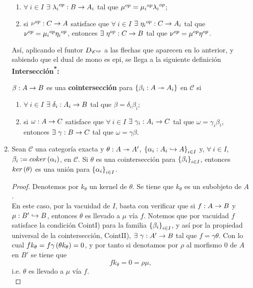 \documentclass{article}
\begin{document}
\begin{enumerate}[label=\textbf{Ej \arabic*.}]
\begin{enumerate}[label=Int\textsuperscript{op}\Roman*)]
			\item $\forall\ i\in I$ $\exists\ \catarrow{\opst{\lambda_i}}{B}{A_i}{}$ tal que ${\mu}^{op}={\mu_i}^{op}{\lambda_i}^{op}$;
			\item si $\catarrow{\opst{\nu}}{C}{A}{}$ satisface que $\forall\ i\in I$ $\exists\ \catarrow{\opst{\eta_i}}{C}{A_i}{}$ tal que ${\nu}^{op}={\mu_i}^{op}{\eta_i}^{op}$, entonces $\exists\ \catarrow{\opst{\eta}}{C}{B}{}$ tal que ${\nu}^{op}={\mu}^{op}{\eta}^{op}$.
		\end{enumerate}
		Así, aplicando el funtor $D_{{\mathscr{C}}^{op}}$ a las flechas que aparecen en lo anterior, y sabiendo que el dual de mono es epi, se llega a la siguiente definición
		\textbf{Intersección\textsuperscript{*}:}
		\begin{definesn}
			$\catarrow{\beta}{A}{B}{}$ es una \textbf{cointersección} para $\lrbrack{\catarrow{\beta_i}{A}{A_i}{e}}$ en $\mathscr{C}$ si
		\begin{enumerate}[label=Coint\Roman*)]
			\item $\forall\ i\in I$ $\exists\ \catarrow{\delta_i}{A_i}{B}{}$ tal que $\beta=\delta_i\beta_i$;
			\item si $\catarrow{\omega}{A}{C}{}$ satisface que $\forall\ i\in I$ $\exists\ \catarrow{\gamma_i}{A_i}{C}{}$ tal que $\omega=\gamma_i\beta_i$, entonces $\exists\ \catarrow{\gamma}{B}{C}{}$ tal que $\omega=\gamma\beta$.
		\end{enumerate}
		\end{definesn}		
				\renewcommand{\copyandpaste}{i\in I}
		\item Sean $\mathscr{C}$ una categoría exacta y $\catarrow{\theta}{A}{A'}{e}$, $\lrbrack{\catarrow{\alpha_i}{A_i}{A}{m}}_{i\in I}$  y, $\forall\ i\in I$, $\beta_i:=coker\left(\alpha_i\right)$, en $\mathscr{C}$. Si $\theta$ es una cointersección para $\left\{\beta_i\right\}_{i\in I}$, entonces $ker\left(\theta\right)$ es una unión para $\left\{\alpha_i\right\}_{i\in I}$.
		\begin{proof}
			Denotemos por $k_{\theta}$ un kernel de $\theta$. Se tiene que $k_{\theta}$ es un subobjeto de $A$.\\
			 En este caso, por la vacuidad de $I$, basta con verificar que si $\catarrow{f}{A}{B}{}$ y $\catarrow{\mu}{B'}{B}{m}$, entonces $\theta$ es llevado a $\mu$ vía $f$. Notemos que por vacuidad $f$ satisface la condición CointI) para la familia $\lrbrack{\beta_i}_{\copyandpaste}$, y así por la propiedad universal de la cointersección, CointII), $\exists\ \catarrow{\gamma}{A'}{B}{}$ tal que $f=\gamma \theta$. Con lo cual $fk_{\theta}=f\gamma\left(\theta k_{\theta}\right)=0$, y por tanto si denotamos por $\rho$ al morfismo $0$ de $A$ en $B'$ se tiene que
			\begin{equation*}
				fk_{\theta}=0=\rho\mu,
			\end{equation*}
			i.e. $\theta$ es llevado a $\mu$ vía $f$.\\
			

\end{proof}
\end{enumerate}
\end{document}
